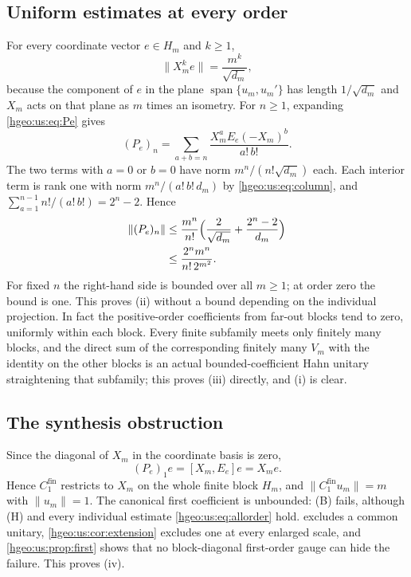 \documentclass[11pt,letterpaper]{article}
\numberwithin{equation}{section}
\theoremstyle{definition}
\theoremstyle{remark}
\newcommand{\Span}{\operatorname{span}}
\newcommand{\norm}[1]{\lVert #1\rVert}
\newcommand{\fin}{\mathrm{fin}}
\begin{document}
\subsection{Uniform estimates at every order}
For every coordinate vector $e\in H_m$ and $k\ge1$,
\begin{equation}\label{hgeo:us:eq:column}
 \norm{X_m^ke}=\frac{m^k}{\sqrt{d_m}} ,
\end{equation}
because the component of $e$ in the plane $\Span\{u_m,u_m'\}$ has length
$1/\sqrt{d_m}$ and $X_m$ acts on that plane as $m$ times an isometry. For
$n\ge1$, expanding \eqref{hgeo:us:eq:Pe} gives
\[
 (P_e)_n=\sum_{a+b=n}\frac{X_m^aE_e(-X_m)^b}{a!\,b!} .
\]
The two terms with $a=0$ or $b=0$ have norm $m^n/(n!\sqrt{d_m})$ each. Each
interior term is rank one with norm $m^n/(a!\,b!\,d_m)$ by
\eqref{hgeo:us:eq:column}, and $\sum_{a=1}^{n-1}n!/(a!\,b!)=2^n-2$. Hence
\begin{align}
 \norm{(P_e)_n}
 &\le\frac{m^n}{n!}\Bigl(\frac{2}{\sqrt{d_m}}+\frac{2^n-2}{d_m}\Bigr)
 \notag\\
 &\le\frac{2^nm^n}{n!\,2^{m^2}} .\label{hgeo:us:eq:allorder}
\end{align}
For fixed $n$ the right-hand side is bounded over all $m\ge1$; at order zero
the bound is one. This proves (ii) without a bound depending on the
individual projection. In fact the positive-order coefficients from far-out
blocks tend to zero, uniformly within each block. Every finite subfamily meets
only finitely many blocks, and the direct sum of the corresponding finitely
many $V_m$ with the identity on the other blocks is an actual
bounded-coefficient Hahn unitary straightening that subfamily; this proves
(iii) directly, and (i) is clear.

\subsection{The synthesis obstruction}
Since the diagonal of $X_m$ in the coordinate basis is zero,
\[
 (P_e)_1e=[X_m,E_e]e=X_me .
\]
Hence $C_1^\fin$ restricts to $X_m$ on the whole finite block $H_m$, and
$\norm{C_1^\fin u_m}=m$ with $\norm{u_m}=1$. The canonical first coefficient is
unbounded: (B) fails, although (H) and every individual estimate
\eqref{hgeo:us:eq:allorder} hold.  excludes a common
unitary, \cref{hgeo:us:cor:extension} excludes one at every enlarged scale,
and \cref{hgeo:us:prop:first} shows that no block-diagonal first-order gauge
can hide the failure. This proves (iv).
\end{document}
